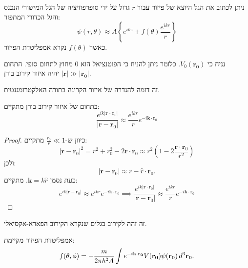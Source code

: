 \documentclass{tstextbook}
\begin{document}
\begin{reminder}
ניתן לכתוב את הגל היוצא של פיזור עבור \(r\) גדול על ידי סופרפוזיציה של הגל המישורי הנכנס והגל הכדורי המתפזר:
$$\psi(r,\theta)\approx A\left\{e^{i k z}+f(\theta)\frac{e^{i k r}}{r}\right\}$$
כאשר \(f\left( \theta \right)\) נקרא אמפליטדת הפיזור.

\end{reminder}
\begin{definition}
נניח כי \(V_{0}\left( \mathbf{r_{0}} \right)\). כלומר ניתן להניח כי הפוטנציאל הוא 0 מחוץ לתחום סופי. התחום \(|\mathbf{r}|\gg |\mathbf{r_{0}}|\) יהיה איזור קירוב בורן.

\end{definition}
\begin{remark}
זה דומה להגדרה של איזור הקרינה בתורה האלקטרומגנטית.

\end{remark}
\begin{lemma}
בתחום של איזור קירוב בורן מתקיים:
$$\frac{e^{i k|\mathbf{r}\,\cdot\,\mathbf{r}_{0}|}}{|\mathbf{r}-\mathbf{r}_{0}|}\approx\frac{e^{i k r}}{r}e^{-i\mathbf{k}\cdot\mathbf{r}_{0}}$$

\end{lemma}
\begin{proof}
כיוון ש-\(\frac{r_{0}}{r}\ll 1\) מתקיים:
$$|\mathbf{r}-\mathbf{r}_{0}|^{2}=r^{2}+r_{0}^{2}-2\mathbf{r}\cdot\mathbf{r}_{0}\approx r^{2}\left(1-2{\frac{\mathbf{r}\cdot\mathbf{r}_{0}}{r^{2}}}\right)$$
ולכן:
$$|\mathbf{r}-\mathbf{r}_{0}|\approx r-{\hat{r}}\cdot\mathbf{r}_{0}.$$
כעת נסמן \(\mathbf{k}=k\hat{r}\). מתקיים:
$$e^{i k|\mathbf{r}-\mathbf{r}_{0}|}\approx e^{i k r}e^{-i\mathbf{k}\cdot\mathbf{r}_{0}}\implies\frac{e^{i k|\mathbf{r}\cdot\mathbf{r}_{0}|}}{|\mathbf{r}-\mathbf{r}_{0}|}\approx\frac{e^{i k r}}{r}e^{-i\mathbf{k}\cdot\mathbf{r}_{0}}$$

\end{proof}
\begin{remark}
זה זהה לקירוב בגלים שנקרא הקירוב הפארא-אקסיאלי.

\end{remark}
\begin{proposition}
אמפליטדת הפיזור מקיימת:
$$f(\theta,\phi)=-\frac{m}{2\pi\hbar^{2}A}\int e^{-i{\bf k\cdot r_{0}}}V({\bf r_{0}})\psi({\bf r_{0}})\,d^{3}{\bf r_{0}}.$$

\end{proposition}
\end{document}
